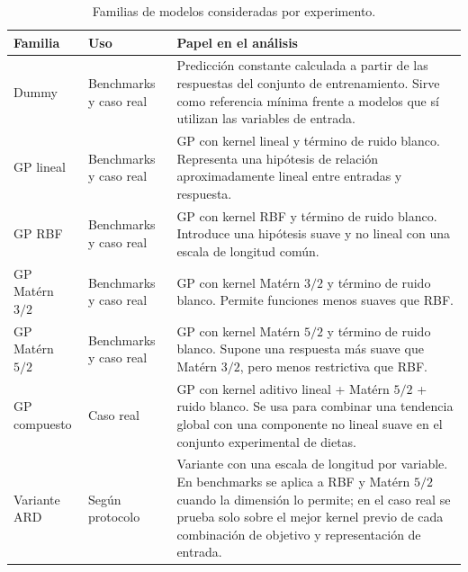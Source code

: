 \begin{table}[htbp]
    \centering
    \small
    \caption[Familias de modelos por experimento]{Familias de modelos consideradas por experimento.}
    \label{tab:modelos_capitulo}
    \renewcommand{\arraystretch}{1.12}
    \begin{tabular}{p{}p{}p{}}
        \toprule
        \textbf{Familia} & \textbf{Uso} & \textbf{Papel en el análisis} \\
        \midrule
        Dummy &
        Benchmarks y caso real &
        Predicción constante calculada a partir de las respuestas del conjunto de entrenamiento. Sirve como referencia mínima frente a modelos que sí utilizan las variables de entrada. \\

        GP lineal &
        Benchmarks y caso real &
        GP con kernel lineal y término de ruido blanco. Representa una hipótesis de relación aproximadamente lineal entre entradas y respuesta. \\

        GP RBF &
        Benchmarks y caso real &
        GP con kernel RBF y término de ruido blanco. Introduce una hipótesis suave y no lineal con una escala de longitud común. \\

        GP Matérn \(3/2\) &
        Benchmarks y caso real &
        GP con kernel Matérn \(3/2\) y término de ruido blanco. Permite funciones menos suaves que RBF. \\

        GP Matérn \(5/2\) &
        Benchmarks y caso real &
        GP con kernel Matérn \(5/2\) y término de ruido blanco. Supone una respuesta más suave que Matérn \(3/2\), pero menos restrictiva que RBF. \\

        GP compuesto &
        Caso real &
        GP con kernel aditivo lineal + Matérn \(5/2\) + ruido blanco. Se usa para combinar una tendencia global con una componente no lineal suave en el conjunto experimental de dietas. \\

        Variante ARD &
        Según protocolo &
        Variante con una escala de longitud por variable. En benchmarks se aplica a RBF y Matérn \(5/2\) cuando la dimensión lo permite; en el caso real se prueba solo sobre el mejor kernel previo de cada combinación de objetivo y representación de entrada. \\
        \bottomrule
    \end{tabular}
\end{table}
\FloatBarrier

